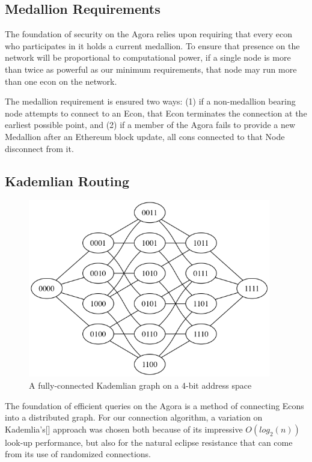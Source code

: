 \documentclass{article}
\begin{document}
\subsection{Medallion Requirements}

The foundation of security on the Agora relies upon requiring that every econ who participates in it holds a current medallion. To ensure that presence on the network will be proportional to computational power, if a single node is more than twice as powerful as our minimum requirements, that node may run more than one econ on the network.

The medallion requirement is ensured two ways: (1) if a non-medallion bearing node attempts to connect to an Econ, that Econ terminates the connection at the earliest possible point, and (2) if a member of the Agora fails to provide a new Medallion after an Ethereum block update, all cons connected to that Node disconnect from it.

\subsection{Kademlian Routing}

\begin{figure}[htbp]
  \centering
  \includegraphics[width = 300pt]{xorSpace}
  \caption{A fully-connected Kademlian graph on a 4-bit address space}
\end{figure}

The foundation of efficient queries on the Agora is a method of connecting Econs into a distributed graph. For our connection algorithm, a variation on Kademlia's[\cite{kademlia}] approach was chosen both because of its impressive $O(log_2(n))$ look-up performance, but also for the natural eclipse resistance that can come from its use of randomized connections.
\end{document}
